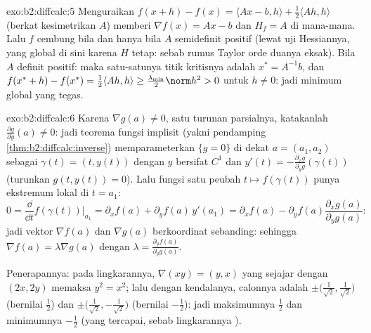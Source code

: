 \begin{solution}{exo:b2:diffcalc:5}
Menguraikan $f(x + h) - f(x) = \langle Ax - b, h\rangle +
\frac12\langle Ah, h\rangle$ (berkat kesimetrikan $A$) memberi $\nabla f(x) = Ax -
b$ dan $H_f = A$ di mana-mana. Lalu $f$ cembung bila dan hanya bila $A$ semidefinit
positif (lewat uji Hessiannya, yang global di sini karena $H$ tetap:
sebab rumus Taylor orde duanya eksak). Bila $A$ definit
positif: maka satu-satunya titik kritisnya adalah $x^* = A^{-1}b$, dan $f(x^*
+ h) - f(x^*) = \frac12\langle Ah, h\rangle \geq
\frac{\lambda_{\min}}{2}\norm h^2 > 0$ untuk $h \neq 0$: jadi minimum
global yang tegas.
\end{solution}

\begin{solution}{exo:b2:diffcalc:6}
Karena $\nabla g(a) \neq 0$, satu turunan parsialnya, katakanlah $\frac{\partial
g}{\partial y}(a) \neq 0$: jadi teorema fungsi implisit
(yakni pendamping \cref{thm:b2:diffcalc:inverse}) memparameterkan $\{g =
0\}$ di dekat $a = (a_1, a_2)$ sebagai $\gamma(t) = (t, y(t))$ dengan $y$
bersifat $C^1$ dan $y'(t) = -\frac{\partial_x g}{\partial_y g}(\gamma(t))$
(turunkan $g(t, y(t)) = 0$). Lalu fungsi satu peubah $t
\mapsto f(\gamma(t))$ punya ekstremum lokal di $t = a_1$:
\[
0 = \frac{\dd}{\dd t}f(\gamma(t))\Big|_{a_1}
= \partial_x f(a) + \partial_y f(a)\,y'(a_1)
= \partial_x f(a) - \partial_yf(a)\frac{\partial_x
g(a)}{\partial_y g(a)} :
\]
jadi vektor $\nabla f(a)$ dan $\nabla g(a)$ berkoordinat
sebanding: sehingga $\nabla f(a) = \lambda \nabla g(a)$ dengan $\lambda =
\frac{\partial_y f(a)}{\partial_y g(a)}$.

Penerapannya: pada lingkarannya, $\nabla(xy) = (y, x)$ yang sejajar dengan
$(2x, 2y)$ memaksa $y^2 = x^2$; lalu dengan kendalanya, calonnya
adalah $\pm\bigl(\tfrac{1}{\sqrt2}, \tfrac{1}{\sqrt2}\bigr)$ (bernilai
$\frac12$) dan $\pm\bigl(\tfrac{1}{\sqrt2},
-\tfrac{1}{\sqrt2}\bigr)$ (bernilai $-\frac12$): jadi maksimumnya $\frac12$ dan minimumnya
$-\frac12$ (yang tercapai, sebab lingkarannya ).
\end{solution}

